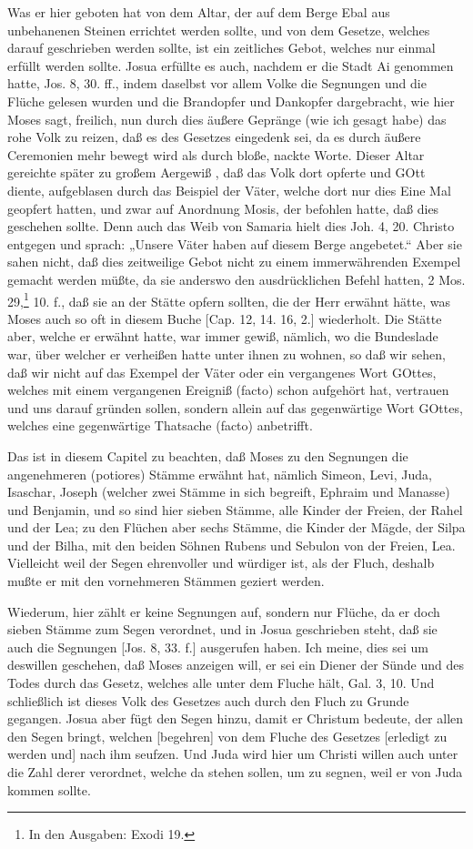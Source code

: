 Was er hier geboten hat von dem Altar, der auf dem Berge Ebal aus unbehanenen Steinen errichtet werden sollte, und von dem Gesetze, welches darauf geschrieben werden sollte, ist ein zeitliches Gebot, welches nur einmal erfüllt werden sollte. Josua erfüllte es auch, nachdem er die Stadt Ai genommen hatte, Jos. 8, 30. ff., indem daselbst vor allem Volke die Segnungen und die Flüche gelesen wurden und die Brandopfer und Dankopfer dargebracht, wie hier Moses sagt, freilich, nun durch dies äußere Gepränge (wie ich gesagt habe) das rohe Volk zu reizen, daß es des Gesetzes eingedenk sei, da es durch äußere Ceremonien mehr bewegt wird als durch bloße, nackte Worte. Dieser Altar gereichte später zu großem Aergewiß
, daß das Volk dort opferte und GOtt diente, aufgeblasen durch das Beispiel der Väter, welche dort nur dies Eine Mal geopfert hatten, und zwar auf Anordnung Mosis, der befohlen hatte, daß dies geschehen sollte. Denn auch das Weib von Samaria hielt dies Joh. 4, 20. Christo entgegen und sprach: „Unsere Väter haben auf diesem Berge angebetet.“ Aber sie sahen nicht, daß dies zeitweilige Gebot nicht zu einem immerwährenden Exempel gemacht werden müßte, da sie anderswo den ausdrücklichen Befehl hatten, 2 Mos. 29,\footnote{In den Ausgaben: Exodi 19.} 10. f., daß sie an der Stätte opfern sollten, die der Herr erwähnt hätte, was Moses auch so oft in diesem Buche [Cap. 12, 14. 16, 2.] wiederholt. Die Stätte aber, welche er erwähnt hatte, war immer gewiß, nämlich, wo die Bundeslade war, über welcher er verheißen hatte unter ihnen zu wohnen, so daß wir sehen, daß wir nicht auf das Exempel der Väter oder ein vergangenes Wort GOttes, welches mit einem vergangenen Ereigniß (facto) schon aufgehört hat, vertrauen und uns darauf gründen sollen, sondern allein auf das gegenwärtige Wort GOttes, welches eine gegenwärtige Thatsache (facto) anbetrifft.

Das ist in diesem Capitel zu beachten, daß Moses zu den Segnungen die angenehmeren (potiores) Stämme erwähnt hat, nämlich Simeon, Levi, Juda, Isaschar, Joseph (welcher zwei Stämme in sich begreift, Ephraim und Manasse) und Benjamin, und so sind hier sieben Stämme, alle Kinder der Freien, der Rahel und der Lea; zu den Flüchen aber sechs Stämme, die Kinder der Mägde, der Silpa und der Bilha, mit den beiden Söhnen Rubens und Sebulon von der Freien, Lea. Vielleicht weil der Segen ehrenvoller und würdiger ist, als der Fluch, deshalb mußte er mit den vornehmeren Stämmen geziert werden.

Wiederum, hier zählt er keine Segnungen auf, sondern nur Flüche, da er doch sieben Stämme zum Segen verordnet, und in Josua geschrieben steht, daß sie auch die Segnungen [Jos. 8, 33. f.] ausgerufen haben. Ich meine, dies sei um deswillen geschehen, daß Moses anzeigen will, er sei ein Diener der Sünde und des Todes durch das Gesetz, welches alle unter dem Fluche hält, Gal. 3, 10. Und schließlich ist dieses Volk des Gesetzes auch durch den Fluch zu Grunde gegangen. Josua aber fügt den Segen hinzu, damit er Christum bedeute, der allen den Segen bringt, welchen [begehren] von dem Fluche des Gesetzes [erledigt zu werden und] nach ihm seufzen. Und Juda wird hier um Christi willen auch unter die Zahl derer verordnet, welche da stehen sollen, um zu segnen, weil er von Juda kommen sollte.

